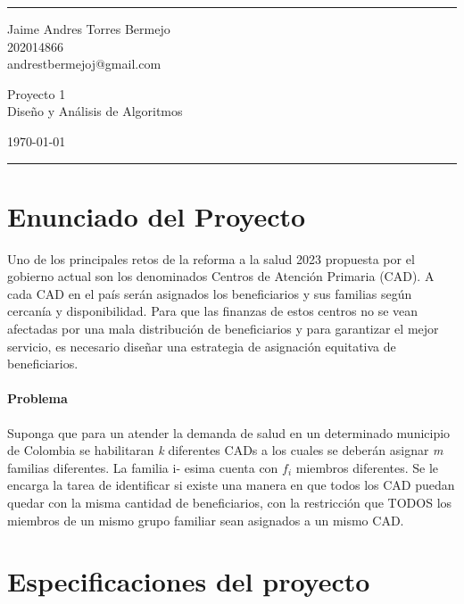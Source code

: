 \documentclass[a4paper]{article}
\begin{document}

\fancyhead[C]{}
\hrule \medskip %
\begin{minipage}{0.295\textwidth} 
\raggedright
\footnotesize
Jaime Andres Torres Bermejo \hfill\\   
202014866\hfill\\
andrestbermejoj@gmail.com
\end{minipage}
\begin{minipage}{0.4\textwidth} 
\centering 
\large 
Proyecto 1\\ 
\normalsize 
Diseño y Análisis de Algoritmos\\ 
\end{minipage}
\begin{minipage}{0.295\textwidth} 
\raggedleft
\today\hfill\\
\end{minipage}
\medskip\hrule 
\bigskip

\section{Enunciado del Proyecto}

Uno de los principales retos de la reforma a la salud 2023 propuesta por el gobierno actual son los
denominados Centros de Atención Primaria (CAD). A cada CAD en el país serán asignados los
beneficiarios y sus familias según cercanía y disponibilidad. Para que las finanzas de estos centros
no se vean afectadas por una mala distribución de beneficiarios y para garantizar el mejor servicio,
es necesario diseñar una estrategia de asignación equitativa de beneficiarios.

\paragraph{Problema}
Suponga que para un atender la demanda de salud en un determinado municipio de Colombia se
habilitaran \textit{k} diferentes CADs a los cuales se deberán asignar \textit{m} familias diferentes. La familia i-
esima cuenta con \textit{$f_i$} miembros diferentes. Se le encarga la tarea de identificar si existe una manera
en que todos los CAD puedan quedar con la misma cantidad de beneficiarios, con la restricción que
TODOS los miembros de un mismo grupo familiar sean asignados a un mismo CAD.
\section{Especificaciones del proyecto}
\end{document}
